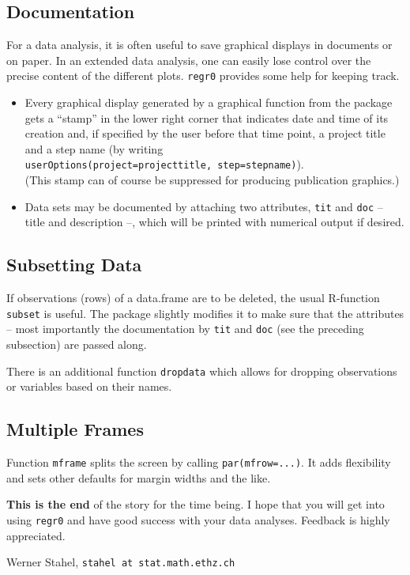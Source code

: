 \documentclass{article}
\providecommand{\T}{\texttt}
\providecommand{\Tit}[1]{\textbf{#1}\hspace{1em}}
\begin{document}
\subsection{Documentation}
For a data analysis, it is often useful to save graphical displays in 
documents or on paper. In an extended data analysis, one can easily lose
control over the precise content of the different plots.
\T{regr0} provides some help for keeping track.
\begin{itemize}
\item 
  Every graphical display generated by a graphical function from the
  package gets a ``stamp'' in the lower right corner that indicates date
  and time of its creation and, if specified by the user before that 
  time point, a project title and a step name (by writing\\
  \T{userOptions(project=projecttitle, step=stepname)}).\\
  (This stamp can of course be suppressed for producing publication
  graphics.) 
\item
  Data sets may be documented by attaching two attributes, \T{tit} and 
  \T{doc} -- title and description --, which will be printed with
  numerical output if desired.
\end{itemize}

\subsection{Subsetting Data}
If observations (rows) of a data.frame are to be deleted, the usual
R-function \T{subset} is useful. The package slightly modifies it to make
sure that the attributes -- most importantly the documentation by
\T{tit} and \T{doc} (see the preceding subsection) are passed along.

There is an additional function \T{dropdata} which allows for dropping
observations or variables based on their names.

\subsection{Multiple Frames}
Function \T{mframe} splits the screen by calling \T{par(mfrow=...)}.
It adds flexibility and sets other defaults for margin widths and the like. 
\\[10mm]

{\small
\Tit{This is the end} of the story for the time being. I hope that you will
get into using \T{regr0} and have good success with your data analyses.
Feedback is highly appreciated.

Werner Stahel, \T{stahel at stat.math.ethz.ch}
}
\end{document}
